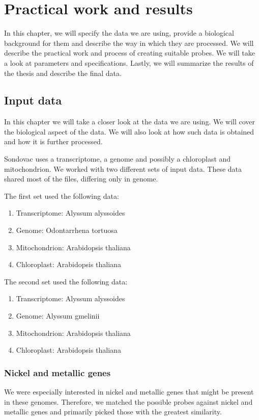 \chapter[Practical work and results]{Practical work and results}
\label{kap:practical_work}

In this chapter,  we will specify the data we are using, provide a biological background for them and describe the way in which they are processed. 
We will describe the practical work and process of creating suitable probes. We will take a look at parameters and specifications. 
Lastly, we will summarize the results of the thesis and describe the final data. 

\section{Input data}
In this chapter we will take a closer look at the data we are using. We will cover the biological aspect of 
the data. %
We will also look at how such data is obtained and how it is further processed. 

Sondovac uses a transcriptome, a genome and possibly a chloroplast and mitochondrion. 
We worked with two different sets of input data. These data shared most of the files, differing only in genome. 

The first set used the following data: 

\begin{enumerate}
\item Transcriptome: Alyssum alyssoides
\item Genome: Odontarrhena tortuosa
\item Mitochondrion: Arabidopsis thaliana
\item Chloroplast: Arabidopsis thaliana
\end{enumerate}

The second set used the following data: 

\begin{enumerate}
\item Transcriptome: Alyssum alyssoides
\item Genome: Alyssum gmelinii
\item Mitochondrion: Arabidopsis thaliana
\item Chloroplast: Arabidopsis thaliana
\end{enumerate}

\subsection{Nickel and metallic genes}
We were especially interested in nickel and metallic genes that might be present in these genomes. Therefore, we matched the possible 
probes against nickel and metallic genes and primarily picked those with the greatest similarity. 

